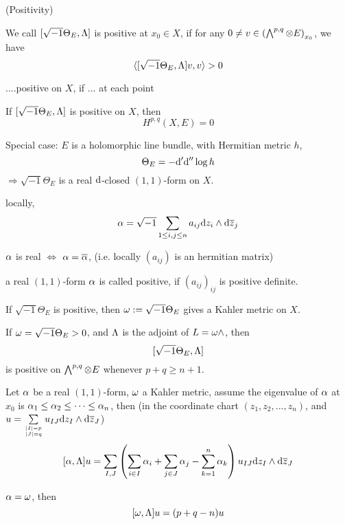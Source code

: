 \begin{definition}(Positivity)

We call $[\sqrt{-1}\Theta_E,\Lambda]$ is positive at $x_0\in X$, if
for any $0\neq v\in\left(\bigwedge\nolimits^{p,q}\otimes E\right)_{x_0}$, we have
$$\langle [\sqrt{-1}\Theta_E,\Lambda]v,v \rangle>0$$

....positive on $X$, if ... at each point
\end{definition}

\begin{thm}
If $[\sqrt{-1}\Theta_E,\Lambda]$ is positive on $X$, then
$$H^{p,q}(X,E)=0$$
\end{thm}

Special case: $E$ is a holomorphic line bundle, with Hermitian metric $h$,
$$\Theta_E=-\mathrm{d}'\mathrm{d}''\log h$$
$\Rightarrow\sqrt{-1}\Theta_E$ is a real $\mathrm{d}$-closed $(1,1)$-form on $X$.

locally,
$$
     \alpha=
\sqrt{-1}\sum_{1\leq i,j\leq n}
  a_{ij}\mathrm{d} z_i\wedge\mathrm{d}\overline{z}_j
$$

$\alpha$ is real $\iff$ $\alpha=\overline{\alpha}$,
(i.e. locally $(a_{ij})$ is an hermitian matrix)

\begin{definition}
a real $(1,1)$-form $\alpha$ is called positive, if
$(a_{ij})_{ij}$ is positive definite.
\end{definition}

\begin{lemma}
If $\sqrt{-1}\Theta_E$ is positive, then $\omega:=\sqrt{-1}\Theta_E$ gives a
Kahler metric on $X$.
\end{lemma}

\begin{lemma}
If $\omega=\sqrt{-1}\Theta_E>0$, and $\Lambda$ is the adjoint of $L=\omega\wedge$,
then
$$[\sqrt{-1}\Theta_E,\Lambda]$$
is positive on $\bigwedge\nolimits^{p,q}\otimes E$
whenever $p+q\geq n+1$.
\end{lemma}

\begin{lemma}
Let $\alpha$ be a real $(1,1)$-form, $\omega$ a Kahler metric, assume
the eigenvalue of $\alpha$ at $x_0$ is $\alpha_1\leq\alpha_2\leq\cdots\leq\alpha_n$,
then (in the coordinate chart $(z_1,z_2,...,z_n)$, and
$u=\sum\limits_{|I|=p\atop|J|=q}u_{IJ}\mathrm{d} z_I\wedge\mathrm{d}\overline{z}_J$)
$$
  [\alpha,\Lambda]u
=
  \sum_{I,J}
    \left(
      \sum_{i\in I}\alpha_i
    + \sum_{j\in J}\alpha_j
    - \sum_{k=1}^n\alpha_k
    \right)
    u_{IJ}\mathrm{d} z_I\wedge\mathrm{d}\overline{z}_J
$$
\end{lemma}

\begin{cor}
$
  \alpha=\omega
$, then
$$[\omega,\Lambda]u=(p+q-n)u$$
\end{cor}

